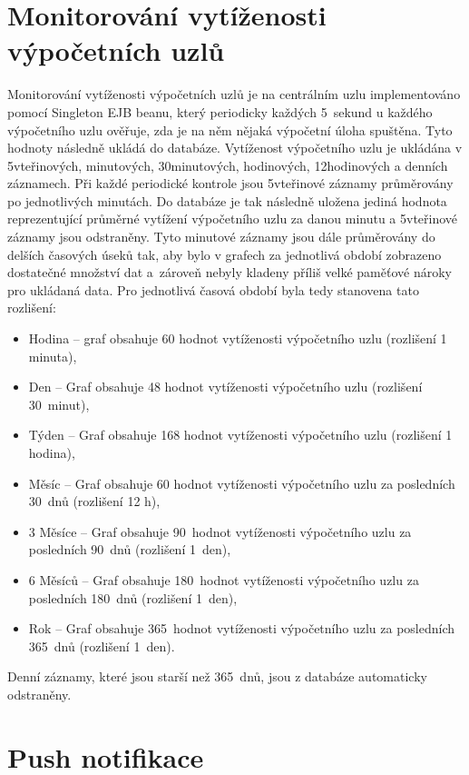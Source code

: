 \section{Monitorování vytíženosti výpočetních uzlů}

Monitorování vytíženosti výpočetních uzlů je na centrálním uzlu implementováno pomocí Singleton EJB beanu, který periodicky každých 5~sekund u každého výpočetního uzlu ověřuje, zda je na něm nějaká výpočetní úloha spuštěna. Tyto hodnoty následně ukládá do databáze. Vytíženost výpočetního uzlu je ukládána v 5vteřinových, minutových, 30minutových, hodinových, 12hodinových a denních záznamech. Při každé periodické kontrole jsou 5vteřinové záznamy průměrovány po jednotlivých minutách. Do databáze je tak následně uložena jediná hodnota reprezentující průměrné vytížení výpočetního uzlu za danou minutu a 5vteřinové záznamy jsou odstraněny. Tyto minutové záznamy jsou dále průměrovány do delších časových úseků tak, aby bylo v grafech za jednotlivá období zobrazeno dostatečné množství dat a~zároveň nebyly kladeny příliš velké paměťové nároky pro ukládaná data. Pro jednotlivá časová období byla tedy stanovena tato rozlišení: 
\begin{itemize}
    \item Hodina -- graf obsahuje 60 hodnot vytíženosti výpočetního uzlu (rozlišení 1 minuta),
    \item Den -- Graf obsahuje 48 hodnot vytíženosti výpočetního uzlu (rozlišení 30~minut),
    \item Týden -- Graf obsahuje 168 hodnot vytíženosti výpočetního uzlu (rozlišení 1 hodina),
    \item Měsíc -- Graf obsahuje 60 hodnot vytíženosti výpočetního uzlu za posledních 30~dnů (rozlišení 12 h),
    \item 3 Měsíce -- Graf obsahuje 90~hodnot vytíženosti výpočetního uzlu za posledních 90~dnů (rozlišení 1~den),
    \item 6 Měsíců -- Graf obsahuje 180~hodnot vytíženosti výpočetního uzlu za posledních 180~dnů (rozlišení 1~den),
    \item Rok -- Graf obsahuje 365~hodnot vytíženosti výpočetního uzlu za posledních 365~dnů (rozlišení 1~den).
\end{itemize}

Denní záznamy, které jsou starší než 365~dnů, jsou z databáze automaticky odstraněny.

\section{Push notifikace}

